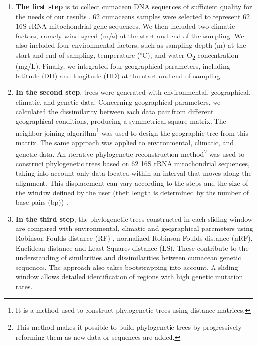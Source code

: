 \begin{enumerate}
\item \textbf{The first step} is to collect cumacean DNA sequences of sufficient quality for the needs of our results \citep{koshkarov_phylogeography_2022}. 62 cumaceans samples were selected to represent 62 16S rRNA mitochondrial gene sequences. We then included two climatic factors, namely wind speed (m/s) at the start and end of the sampling. We also included four environmental factors, such as sampling depth (m) at the start and end of sampling, temperature ($^\circ$C), and water O\textsubscript{2} concentration (mg/L). Finally, we integrated four geographical parameters, including latitude (DD) and longitude (DD) at the start and end of sampling.

\item \textbf{In the second step}, trees were generated with environmental, geographical, climatic, and genetic data. Concerning geographical parameters, we calculated the dissimilarity between each data pair from different geographical conditions, producing a symmetrical square matrix. The {neighbor-joining algorithm}\footnote{It is a method used to construct phylogenetic trees using distance matrices.} was used to design the geographic tree from this matrix. The same approach was applied to environmental, climatic, and genetic data. An {iterative phylogenetic reconstruction method}\footnote{This method makes it possible to build phylogenetic trees by progressively reforming them as new data or sequences are added.} was used to construct phylogenetic trees based on 62 16S rRNA mitochondrial sequences, taking into account only data located within an interval that moves along the alignment. This displacement can vary according to the steps and the size of the window defined by the user (their length is determined by the number of base pairs (bp)) \citep{koshkarov_phylogeography_2022}.

\item \textbf{In the third step}, the phylogenetic trees constructed in each sliding window are compared with environmental, climatic and geographical parameters using Robinson-Foulds distance (RF) \citep{robinson_comparison_1981, koshkarov_phylogeography_2022}, normalized Robinson-Foulds distance (nRF), Euclidean distance and Least-Squares distance (LS). These contribute to the understanding of similarities and dissimilarities between cumacean genetic sequences. The approach also takes bootstrapping into account. A sliding window allows detailed identification of regions with high genetic mutation rates.
\end{enumerate}

